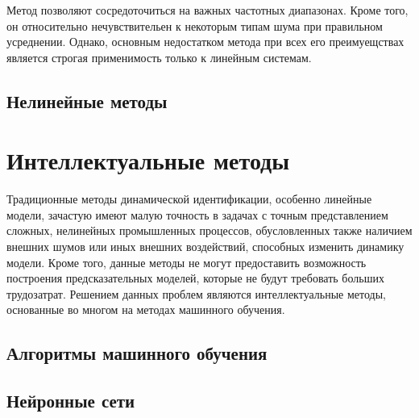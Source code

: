 Метод позволяют сосредоточиться на важных частотных диапазонах. Кроме того, он относительно нечувствительен к некоторым типам шума при правильном усреднении. Однако, основным недостатком метода при всех его преимуещствах является строгая применимость только к линейным системам.

\subsection{Нелинейные методы}

\section{Интеллектуальные методы}

Традиционные методы динамической идентификации, особенно линейные модели,
зачастую имеют малую точность в задачах с точным представлением сложных,
нелинейных промышленных процессов, обусловленных также наличием внешних шумов
или иных внешних воздействий, способных изменить динамику модели. Кроме того, 
данные методы не могут предоставить возможность построения предсказательных 
моделей, которые не будут требовать больших трудозатрат. Решением данных 
проблем являются интеллектуальные методы, основанные во многом на методах 
машинного обучения.

\subsection{Алгоритмы машинного обучения}  

\subsection{Нейронные сети}

